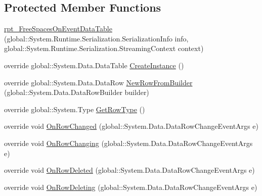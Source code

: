 \subsection*{Protected Member Functions}
\begin{DoxyCompactItemize}
\item 
\hyperlink{classprj_progra_i_i_i_1_1rpt___free_spaces_on_event_1_1rpt___free_spaces_on_event_data_table_a73ebc684d86a88c0c4b49ec031584ec5}{rpt\+\_\+\+Free\+Spaces\+On\+Event\+Data\+Table} (global\+::\+System.\+Runtime.\+Serialization.\+Serialization\+Info info, global\+::\+System.\+Runtime.\+Serialization.\+Streaming\+Context context)
\item 
override global\+::\+System.\+Data.\+Data\+Table \hyperlink{classprj_progra_i_i_i_1_1rpt___free_spaces_on_event_1_1rpt___free_spaces_on_event_data_table_aac3179473fb0afa8971f26df1c7195ae}{Create\+Instance} ()
\item 
override global\+::\+System.\+Data.\+Data\+Row \hyperlink{classprj_progra_i_i_i_1_1rpt___free_spaces_on_event_1_1rpt___free_spaces_on_event_data_table_a8344912074645293f0ff3d0de527def7}{New\+Row\+From\+Builder} (global\+::\+System.\+Data.\+Data\+Row\+Builder builder)
\item 
override global\+::\+System.\+Type \hyperlink{classprj_progra_i_i_i_1_1rpt___free_spaces_on_event_1_1rpt___free_spaces_on_event_data_table_a02cf3becf54121c22436785aa68ba9d9}{Get\+Row\+Type} ()
\item 
override void \hyperlink{classprj_progra_i_i_i_1_1rpt___free_spaces_on_event_1_1rpt___free_spaces_on_event_data_table_ab13f3123022b9ca844c3b37a032e8920}{On\+Row\+Changed} (global\+::\+System.\+Data.\+Data\+Row\+Change\+Event\+Args e)
\item 
override void \hyperlink{classprj_progra_i_i_i_1_1rpt___free_spaces_on_event_1_1rpt___free_spaces_on_event_data_table_a936089efd23566b02a19b1206c869e4f}{On\+Row\+Changing} (global\+::\+System.\+Data.\+Data\+Row\+Change\+Event\+Args e)
\item 
override void \hyperlink{classprj_progra_i_i_i_1_1rpt___free_spaces_on_event_1_1rpt___free_spaces_on_event_data_table_adf8fe6920d9575f72c1a040812965a04}{On\+Row\+Deleted} (global\+::\+System.\+Data.\+Data\+Row\+Change\+Event\+Args e)
\item 
override void \hyperlink{classprj_progra_i_i_i_1_1rpt___free_spaces_on_event_1_1rpt___free_spaces_on_event_data_table_a1a062b982bd9155342f101a96b321a2c}{On\+Row\+Deleting} (global\+::\+System.\+Data.\+Data\+Row\+Change\+Event\+Args e)
\end{DoxyCompactItemize}
